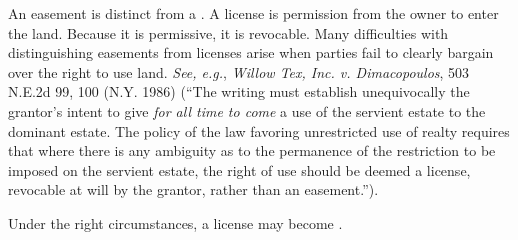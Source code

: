 An easement is distinct from a . A license is permission from
the owner to enter the land. Because it is permissive, it is revocable. Many
difficulties with distinguishing easements from licenses arise when parties fail
to clearly bargain over the right to use land. \textit{See, e.g.}, \emph{Willow
Tex, Inc. v. Dimacopoulos}, 503 N.E.2d 99, 100 (N.Y. 1986) (``The writing must
establish unequivocally the grantor's intent to give \textit{for all time
to come} a use of the servient estate to the dominant estate. The policy of the
law favoring unrestricted use of realty requires that where there is any
ambiguity as to the permanence of the restriction to be imposed on the servient
estate, the right of use should be deemed a license, revocable at will by the
grantor, rather than an easement.'').  

Under the right circumstances, a license may become . 

